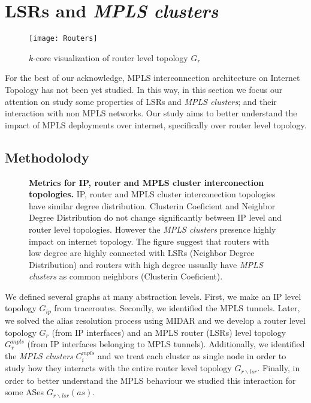 \section{LSRs and \textit{MPLS clusters}}\label{cluster}
      
\begin{figure}[!t]
	\centering
		\texttt{[image: Routers]}
		\caption{$k$-core visualization of router level topology $G_{r}$ }
		\label{fig_k_core_routers}
\end{figure}

For the best of our acknowledge, MPLS interconnection architecture on Internet Topology has not
been yet studied. In this way, in this section we focus our attention on study some properties
of LSRs and \textit{MPLS clusters}; and their interaction with non MPLS networks. Our study aims to better understand the impact of MPLS deployments over internet, specifically over router level topology.

\subsection{Methodolody}\label{cluster.methodo}

\begin{figure*}[!htb]
  \begin{center}
    \hfil
    \hfil
  \end{center}
\caption{\textbf{Metrics for IP, router and MPLS cluster interconection topologies.} IP, router and MPLS cluster interconection topologies have similar degree distribution. Clusterin Coeficient and Neighbor Degree Distribution do not change significantly between IP level and router level topologies. However the \textit{MPLS clusters} presence highly impact on internet topology. The figure suggest that routers with low degree are highly connected with LSRs (Neighbor Degree Distribution) and routers with high degree ussually have \textit{MPLS clusters} as common neighbors (Clusterin Coeficient).} \label{fig_metrics}
\end{figure*}

We defined several graphs at many abstraction levels. First, we make an IP level topology $G_{ip}$ from traceroutes. Secondly, we identified the MPLS tunnels. Later, we solved the alias resolution process using MIDAR and we develop a router level topology $G_{r}$ (from IP interfaces) and an MPLS router (LSRs) level topology  $G^{mpls}_{r}$ (from IP interfaces belonging to MPLS tunnels). Additionally,  we identified the \textit{MPLS clusters} $C^{mpls}_{i}$ and we treat each cluster as single node in order to study how they interacts with the entire router level topology $G_{r\backslash lsr}$. Finally, in order to better understand the MPLS behaviour  we studied this interaction for some ASes $G_{r\backslash lsr}(as)$.

